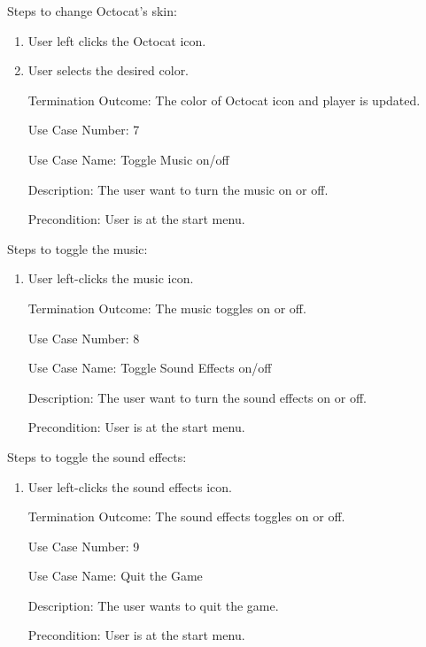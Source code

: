 \documentclass[10pt,conference,onecolumn,compsoc]{IEEEtran}
\begin{document}
Steps to change Octocat's skin:

\begin{enumerate}
\item User left clicks the Octocat icon.
\item User selects the desired color.
\item[Termination Outcome:] The color of Octocat icon and player is updated.\\
\end{enumerate}

\begin{itemize}
\item[Use Case Number:] 7
\item[Use Case Name:] Toggle Music on/off
\item[Description:] The user want to turn the music on or off.
\item[Precondition:] User is at the start menu.
\end{itemize}

Steps to toggle the music:

\begin{enumerate}
\item User left-clicks the music icon.
\item[Termination Outcome:] The music toggles on or off.\\
\end{enumerate}

\begin{itemize}
\item[Use Case Number:] 8
\item[Use Case Name:] Toggle Sound Effects on/off
\item[Description:] The user want to turn the sound effects  on or off.
\item[Precondition:] User is at the start menu.
\end{itemize}

Steps to toggle the sound effects:

\begin{enumerate}
\item User left-clicks the sound effects icon.
\item[Termination Outcome:] The sound effects toggles on or off.\\
\end{enumerate}

\begin{itemize}
\item[Use Case Number:] 9
\item[Use Case Name:] Quit the Game
\item[Description:] The user wants to quit the game.
\item[Precondition:] User is at the start menu.
\end{itemize}
\end{document}
